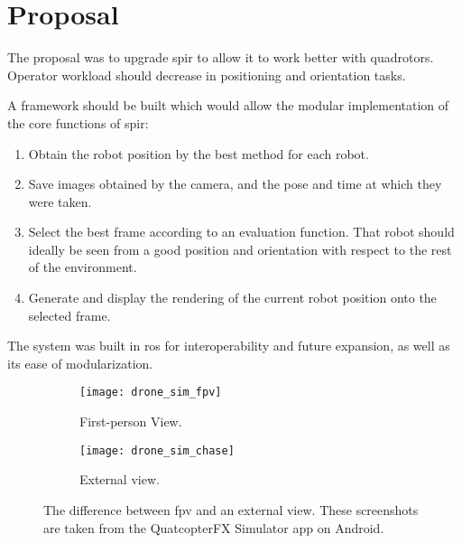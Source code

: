 \chapter{Proposal}
\label{sec:proposal}
\setlength{\epigraphwidth}{0.43\textwidth}
  The proposal was to upgrade \gls{spir} to allow it to work better with quadrotors.
  Operator workload should decrease in positioning and orientation tasks.

  A framework should be built which would allow the modular implementation of the core functions of \gls{spir}:

  \begin{enumerate}
    \item Obtain the robot position by the best method for each robot.
    \item Save images obtained by the camera, and the pose and time at which they were taken.
    \item Select the best frame according to an evaluation function.
          That robot should ideally be seen from a good position and orientation with respect to the rest of the environment.
    \item Generate and display the rendering of the current robot position onto the selected frame.
  \end{enumerate}

  The system was built in \gls{ros} for interoperability and future expansion, as well as its ease of modularization.

  \begin{figure}[h]
    \centering
    \begin{subfigure}[b]{0.45\textwidth}
      \texttt{[image: drone\_sim\_fpv]}
      \caption{First-person View.}
    \end{subfigure}
    \hfill
    \begin{subfigure}[b]{0.45\textwidth}
      \texttt{[image: drone\_sim\_chase]}
      \caption{External view.}
    \end{subfigure}
    \caption[Difference between FPV and external views]{The difference between \gls{fpv} and an external view. These screenshots are taken from the QuatcopterFX Simulator app on Android.}
    \label{fig:fpv_vs_chase}
  \end{figure}

